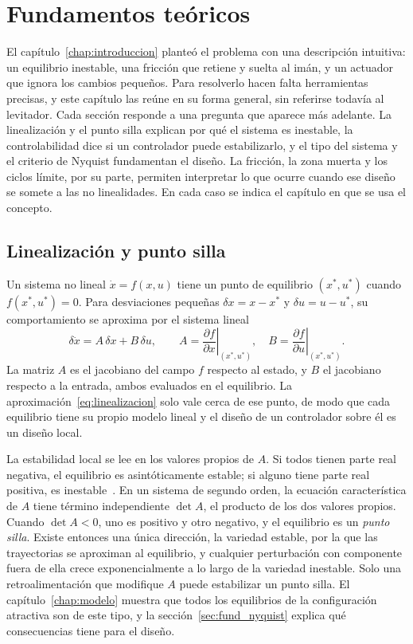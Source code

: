 \chapter{Fundamentos teóricos}\label{chap:fundamentos}

El capítulo~\ref{chap:introduccion} planteó el problema con una descripción intuitiva: un equilibrio inestable, una fricción que retiene y suelta al imán, y un actuador que ignora los cambios pequeños. Para resolverlo hacen falta herramientas precisas, y este capítulo las reúne en su forma general, sin referirse todavía al levitador. Cada sección responde a una pregunta que aparece más adelante. La linealización y el punto silla explican por qué el sistema es inestable, la controlabilidad dice si un controlador puede estabilizarlo, y el tipo del sistema y el criterio de Nyquist fundamentan el diseño. La fricción, la zona muerta y los ciclos límite, por su parte, permiten interpretar lo que ocurre cuando ese diseño se somete a las no linealidades. En cada caso se indica el capítulo en que se usa el concepto.

\section{Linealización y punto silla}\label{sec:fund_linealizacion}

Un sistema no lineal $\dot{x}=f(x,u)$ tiene un punto de equilibrio $(x^*,u^*)$ cuando $f(x^*,u^*)=0$. Para desviaciones pequeñas $\delta x = x-x^*$ y $\delta u = u-u^*$, su comportamiento se aproxima por el sistema lineal
\begin{equation}
\delta\dot{x} = A\,\delta x + B\,\delta u, \qquad
A=\left.\frac{\partial f}{\partial x}\right|_{(x^*,u^*)}, \quad
B=\left.\frac{\partial f}{\partial u}\right|_{(x^*,u^*)} .
\label{eq:linealizacion}
\end{equation}
La matriz $A$ es el jacobiano del campo $f$ respecto al estado, y $B$ el jacobiano respecto a la entrada, ambos evaluados en el equilibrio. La aproximación~\eqref{eq:linealizacion} solo vale cerca de ese punto, de modo que cada equilibrio tiene su propio modelo lineal y el diseño de un controlador sobre él es un diseño local.

La estabilidad local se lee en los valores propios de $A$. Si todos tienen parte real negativa, el equilibrio es asintóticamente estable; si alguno tiene parte real positiva, es inestable~\cite{khalil2}. En un sistema de segundo orden, la ecuación característica de $A$ tiene término independiente $\det A$, el producto de los dos valores propios. Cuando $\det A<0$, uno es positivo y otro negativo, y el equilibrio es un \emph{punto silla}. Existe entonces una única dirección, la variedad estable, por la que las trayectorias se aproximan al equilibrio, y cualquier perturbación con componente fuera de ella crece exponencialmente a lo largo de la variedad inestable. Solo una retroalimentación que modifique $A$ puede estabilizar un punto silla. El capítulo~\ref{chap:modelo} muestra que todos los equilibrios de la configuración atractiva son de este tipo, y la sección~\ref{sec:fund_nyquist} explica qué consecuencias tiene para el diseño.

